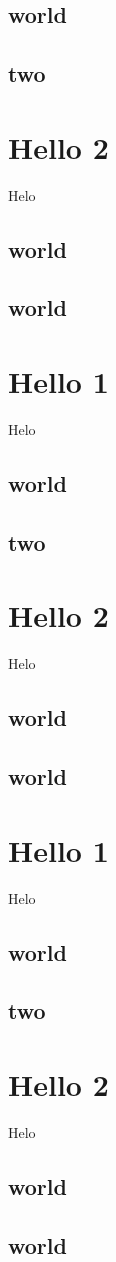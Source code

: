 \documentclass[10pt]{book}
\begin{document}
\section{world }
\section{two}

\chapter{Hello 2}
Helo
\section{world }
\section{world }\chapter{Hello 1}
Helo
\section{world }
\section{two}

\chapter{Hello 2}
Helo
\section{world }
\section{world }\chapter{Hello 1}
Helo
\section{world }
\section{two}

\chapter{Hello 2}
Helo
\section{world }
\section{world }
\end{document}
